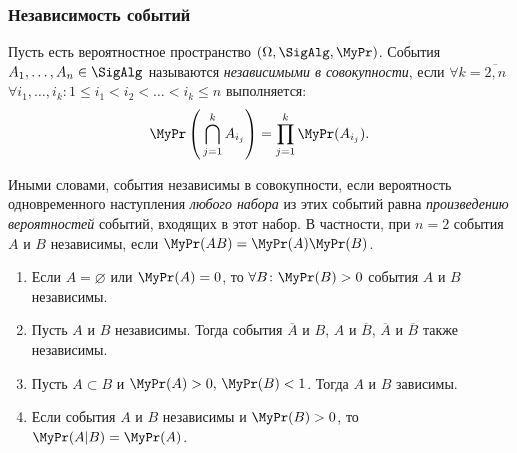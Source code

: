 \subsubsection{Независимость событий}
\begin{defn}
	Пусть есть вероятностное пространство $(\Omega, \SigAlg, \MyPr)$. 
	События $A_1, \ldots, A_n \in \SigAlg$ называются \textit{независимыми в совокупности}, если 
	$\forall k = \overline{2, n}$ $\forall i_{1}, \ldots, i_{k} \colon 1 \leqslant i_1 < i_2 < \ldots < i_k \leqslant n$ выполняется:
	\begin{equation*}
		\MyPr\left(\, \bigcap\limits_{j=1}^k A_{i_j}\right) = \prod\limits_{j=1}^k \MyPr(A_{i_j}).
	\end{equation*}
	
	Иными словами, события независимы в совокупности, если вероятность одновременного наступления \textit{любого набора} из этих событий равна \textit{произведению вероятностей} событий, входящих в этот набор. 
	В частности, при $n = 2$ события $A$ и $B$ независимы, если $\MyPr(AB) = \MyPr(A)\MyPr(B)$.
\end{defn}

\begin{namedthm}\leavevmode
	\begin{enumerate}
		\item 
		      Если $A = \varnothing$ или $\MyPr(A) = 0$, то $\forall B \colon \MyPr(B) > 0$ события $A$ и $B$ независимы.
		\item 
		      Пусть $A$ и $B$ независимы. Тогда события $\overline{A}$ и $B$, $A$ и $\overline{B}$, $\overline{A}$ и $\overline{B}$ также независимы. 
		\item 
		      Пусть $A \subset B$ и $\MyPr(A) > 0, \, \MyPr(B) < 1$. Тогда $A$ и $B$ зависимы. 
		\item 
		      Если события $A$ и $B$ независимы и $\MyPr(B) > 0$, то $\MyPr(A|B) = \MyPr(A)$.
	\end{enumerate}
\end{namedthm}

